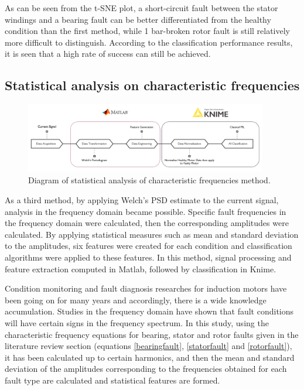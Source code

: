 As can be seen from the t-SNE plot, a short-circuit fault between the stator windings and a bearing fault can be better differentiated from the healthy condition than the first method, while 1 bar-broken rotor fault is still relatively more difficult to distinguish. According to the classification performance results, it is seen that a high rate of success can still be achieved.

\subsection{Statistical analysis on characteristic frequencies}
\begin{figure}[h]
	\centering
	\includegraphics[width=300pt,keepaspectratio=true]{./fig/method3.PNG}
	\caption{Diagram of statistical analysis of characteristic frequencies method.}	
	\label{method3}
\end{figure}
As a third method, by applying Welch's PSD estimate to the current signal, analysis in the frequency domain became possible. Specific fault frequencies in the frequency domain were calculated, then the corresponding amplitudes were calculated. By applying statistical measures such as mean and standard deviation to the amplitudes, six features were created for each condition and classification algorithms were applied to these features. In this method, signal processing and feature extraction computed in Matlab, followed by classification in Knime.

Condition monitoring and fault diagnosis researches for induction motors have been going on for many years and accordingly, there is a wide knowledge accumulation. Studies in the frequency domain have shown that fault conditions will have certain signs in the frequency spectrum. In this study, using the characteristic frequency equations for bearing, stator and rotor faults given in the literature review section (equations \ref{bearingfault}, \ref{statorfault} and \ref{rotorfault}), it has been calculated up to certain harmonics, and then the mean and standard deviation of the amplitudes corresponding to the frequencies obtained for each fault type are calculated and statistical features are formed.

